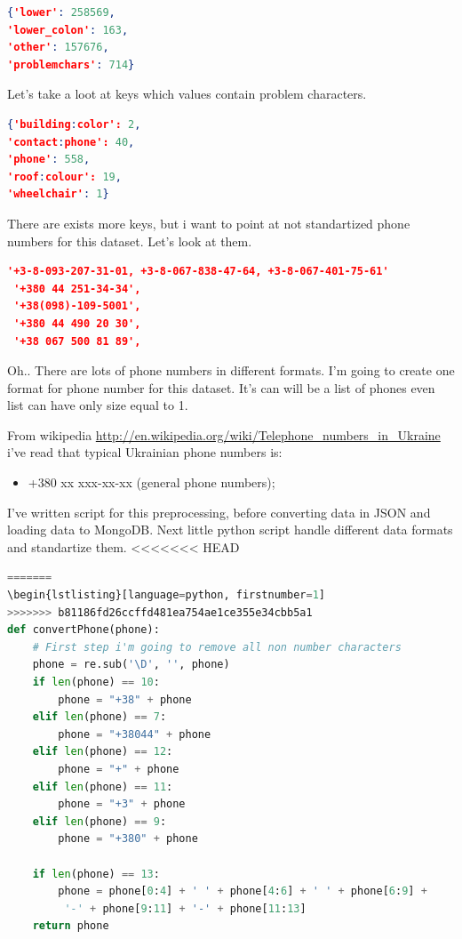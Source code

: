 \documentclass[a4paper,12pt]{article}
\begin{document}
\begin{lstlisting}[language=json,firstnumber=1]
{'lower': 258569,
'lower_colon': 163,
'other': 157676,
'problemchars': 714}
\end{lstlisting}
Let's take a loot at keys which values contain problem characters.
\begin{lstlisting}[language=json,firstnumber=1]
{'building:color': 2,
'contact:phone': 40,
'phone': 558,
'roof:colour': 19,
'wheelchair': 1}
\end{lstlisting}
There are exists more keys, but i want to point at not standartized phone numbers for this dataset. Let's look at them.
\begin{lstlisting}[language=json, firstnumber=1]
'+3-8-093-207-31-01, +3-8-067-838-47-64, +3-8-067-401-75-61'
 '+380 44 251-34-34',
 '+38(098)-109-5001',
 '+380 44 490 20 30',
 '+38 067 500 81 89',
\end{lstlisting}
Oh.. There are lots of phone numbers in different formats. I'm going to create one format for phone number for this dataset. It's can will be a list of phones even list can have only size equal to 1.\par
From wikipedia \url{http://en.wikipedia.org/wiki/Telephone_numbers_in_Ukraine} i've read that typical Ukrainian phone numbers is:
\begin{itemize}
\item +380 xx xxx-xx-xx (general phone numbers);
\end{itemize}
I've written script for this preprocessing, before converting data in JSON and loading data to MongoDB. Next little python script handle different data formats and standartize them.
<<<<<<< HEAD
\begin{lstlisting}[language=python, firstnumber=1, caption={Phone standartization}]
=======
\begin{lstlisting}[language=python, firstnumber=1]
>>>>>>> b81186fd26ccffd481ea754ae1ce355e34cbb5a1
def convertPhone(phone):
    # First step i'm going to remove all non number characters
    phone = re.sub('\D', '', phone)
    if len(phone) == 10:
        phone = "+38" + phone
    elif len(phone) == 7:
        phone = "+38044" + phone
    elif len(phone) == 12:
        phone = "+" + phone
    elif len(phone) == 11:
        phone = "+3" + phone
    elif len(phone) == 9:
        phone = "+380" + phone

    if len(phone) == 13:
        phone = phone[0:4] + ' ' + phone[4:6] + ' ' + phone[6:9] +
         '-' + phone[9:11] + '-' + phone[11:13]
    return phone
\end{lstlisting} 
\end{document}
